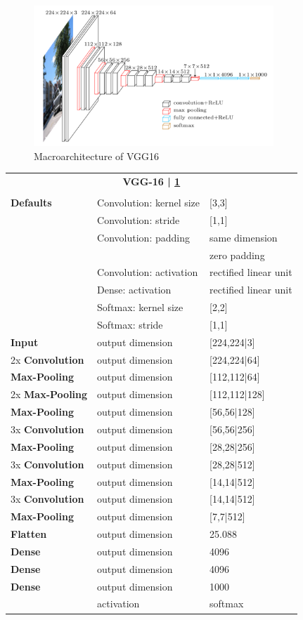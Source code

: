 \begin{figure}[h]
	\centering
	\includegraphics[height=200px]{gfx/vgg16.png}
	\caption{Macroarchitecture of VGG16\\
		\cite{VGG16}}
	\label{fig:VGG16}
\end{figure}
\begin{tabularx}{\textwidth}{X X X}
	\multicolumn{3}{c}{\textbf{VGG-16 | \ref{fig:VGG16}}}\\
	\\
	\hline
	\endhead
	\textbf{Defaults} & Convolution: kernel size & [3,3]\\
	& Convolution: stride & [1,1]\\
	& Convolution: padding & same dimension\\
	& & zero padding\\
	& Convolution: activation & rectified linear unit\\
	& Dense: activation & rectified linear unit\\
	& Softmax: kernel size & [2,2]\\
	& Softmax: stride & [1,1]\\
	\hline
	\textbf{Input} & output dimension & [224,224|3]\\
	[8pt]
	2x \textbf{Convolution} & output dimension & [224,224|64]\\
	[8pt]
	\textbf{Max-Pooling} & output dimension & [112,112|64]\\
	[8pt]
	2x \textbf{Max-Pooling} & output dimension & [112,112|128]\\
	[8pt]
	\textbf{Max-Pooling} & output dimension & [56,56|128]\\
	[8pt]
	3x \textbf{Convolution} & output dimension & [56,56|256]\\
	[8pt]
	\textbf{Max-Pooling} & output dimension & [28,28|256]\\
	[8pt]
	3x \textbf{Convolution} & output dimension & [28,28|512]\\
	[8pt]
	\textbf{Max-Pooling} & output dimension & [14,14|512]\\
	[8pt]
	3x \textbf{Convolution} & output dimension & [14,14|512]\\
	[8pt]
	\textbf{Max-Pooling} & output dimension & [7,7|512]\\
	[8pt]
	\textbf{Flatten} & output dimension & 25.088\\
	[8pt]
	\textbf{Dense} & output dimension & 4096\\
	[8pt]
	\textbf{Dense} & output dimension & 4096\\
	[8pt]
	\textbf{Dense} & output dimension & 1000\\
	& activation & softmax\\
	\hline
\end{tabularx}


